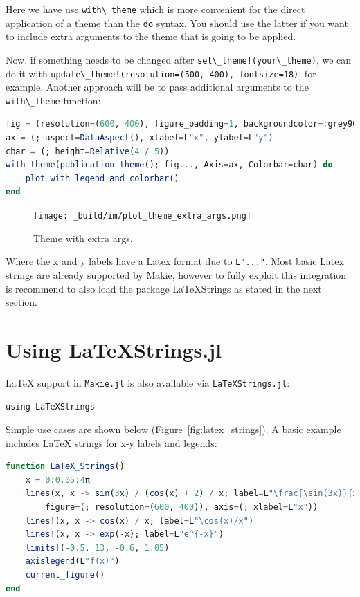 \documentclass[
  notoc %
]{tufte-book}
\newcommand{\passthrough}[1]{#1}
\begin{document}
Here we have use \passthrough{\lstinline!with\_theme!} which is more
convenient for the direct application of a theme than the
\passthrough{\lstinline!do!} syntax. You should use the latter if you
want to include extra arguments to the theme that is going to be
applied.

Now, if something needs to be changed after
\passthrough{\lstinline"set\_theme!(your\_theme)"}, we can do it with
\passthrough{\lstinline"update\_theme!(resolution=(500, 400), fontsize=18)"},
for example. Another approach will be to pass additional arguments to
the \passthrough{\lstinline!with\_theme!} function:

\begin{lstlisting}[language=Julia]
fig = (resolution=(600, 400), figure_padding=1, backgroundcolor=:grey90)
ax = (; aspect=DataAspect(), xlabel=L"x", ylabel=L"y")
cbar = (; height=Relative(4 / 5))
with_theme(publication_theme(); fig..., Axis=ax, Colorbar=cbar) do
    plot_with_legend_and_colorbar()
end
\end{lstlisting}

\begin{figure}
\hypertarget{fig:plot_theme_extra_args}{%
\centering
\texttt{[image: \_build/im/plot\_theme\_extra\_args.png]}
\caption{Theme with extra args.}\label{fig:plot_theme_extra_args}
}
\end{figure}

Where the x and y labels have a Latex format due to
\passthrough{\lstinline!L"..."!}. Most basic Latex strings are already
supported by Makie, however to fully exploit this integration is
recommend to also load the package LaTeXStrings as stated in the next
section.

\hypertarget{using-latexstrings.jl}{%
\section{Using LaTeXStrings.jl}\label{using-latexstrings.jl}}

LaTeX support in \passthrough{\lstinline!Makie.jl!} is also available
via \passthrough{\lstinline!LaTeXStrings.jl!}:

\begin{lstlisting}
using LaTeXStrings
\end{lstlisting}

Simple use cases are shown below (Figure~\ref{fig:latex_strings}). A
basic example includes LaTeX strings for x-y labels and legends:

\begin{lstlisting}[language=Julia]
function LaTeX_Strings()
    x = 0:0.05:4π
    lines(x, x -> sin(3x) / (cos(x) + 2) / x; label=L"\frac{\sin(3x)}{x(\cos(x)+2)}",
        figure=(; resolution=(600, 400)), axis=(; xlabel=L"x"))
    lines!(x, x -> cos(x) / x; label=L"\cos(x)/x")
    lines!(x, x -> exp(-x); label=L"e^{-x}")
    limits!(-0.5, 13, -0.6, 1.05)
    axislegend(L"f(x)")
    current_figure()
end
\end{lstlisting}
\end{document}
